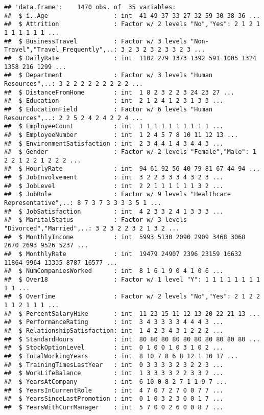 \documentclass[]{article}
\begin{document}
\begin{verbatim}
## 'data.frame':    1470 obs. of  35 variables:
##  $ ï..Age                  : int  41 49 37 33 27 32 59 30 38 36 ...
##  $ Attrition               : Factor w/ 2 levels "No","Yes": 2 1 2 1 1 1 1 1 1 1 ...
##  $ BusinessTravel          : Factor w/ 3 levels "Non-Travel","Travel_Frequently",..: 3 2 3 2 3 2 3 3 2 3 ...
##  $ DailyRate               : int  1102 279 1373 1392 591 1005 1324 1358 216 1299 ...
##  $ Department              : Factor w/ 3 levels "Human Resources",..: 3 2 2 2 2 2 2 2 2 2 ...
##  $ DistanceFromHome        : int  1 8 2 3 2 2 3 24 23 27 ...
##  $ Education               : int  2 1 2 4 1 2 3 1 3 3 ...
##  $ EducationField          : Factor w/ 6 levels "Human Resources",..: 2 2 5 2 4 2 4 2 2 4 ...
##  $ EmployeeCount           : int  1 1 1 1 1 1 1 1 1 1 ...
##  $ EmployeeNumber          : int  1 2 4 5 7 8 10 11 12 13 ...
##  $ EnvironmentSatisfaction : int  2 3 4 4 1 4 3 4 4 3 ...
##  $ Gender                  : Factor w/ 2 levels "Female","Male": 1 2 2 1 2 2 1 2 2 2 ...
##  $ HourlyRate              : int  94 61 92 56 40 79 81 67 44 94 ...
##  $ JobInvolvement          : int  3 2 2 3 3 3 4 3 2 3 ...
##  $ JobLevel                : int  2 2 1 1 1 1 1 1 3 2 ...
##  $ JobRole                 : Factor w/ 9 levels "Healthcare Representative",..: 8 7 3 7 3 3 3 3 5 1 ...
##  $ JobSatisfaction         : int  4 2 3 3 2 4 1 3 3 3 ...
##  $ MaritalStatus           : Factor w/ 3 levels "Divorced","Married",..: 3 2 3 2 2 3 2 1 3 2 ...
##  $ MonthlyIncome           : int  5993 5130 2090 2909 3468 3068 2670 2693 9526 5237 ...
##  $ MonthlyRate             : int  19479 24907 2396 23159 16632 11864 9964 13335 8787 16577 ...
##  $ NumCompaniesWorked      : int  8 1 6 1 9 0 4 1 0 6 ...
##  $ Over18                  : Factor w/ 1 level "Y": 1 1 1 1 1 1 1 1 1 1 ...
##  $ OverTime                : Factor w/ 2 levels "No","Yes": 2 1 2 2 1 1 2 1 1 1 ...
##  $ PercentSalaryHike       : int  11 23 15 11 12 13 20 22 21 13 ...
##  $ PerformanceRating       : int  3 4 3 3 3 3 4 4 4 3 ...
##  $ RelationshipSatisfaction: int  1 4 2 3 4 3 1 2 2 2 ...
##  $ StandardHours           : int  80 80 80 80 80 80 80 80 80 80 ...
##  $ StockOptionLevel        : int  0 1 0 0 1 0 3 1 0 2 ...
##  $ TotalWorkingYears       : int  8 10 7 8 6 8 12 1 10 17 ...
##  $ TrainingTimesLastYear   : int  0 3 3 3 3 2 3 2 2 3 ...
##  $ WorkLifeBalance         : int  1 3 3 3 3 2 2 3 3 2 ...
##  $ YearsAtCompany          : int  6 10 0 8 2 7 1 1 9 7 ...
##  $ YearsInCurrentRole      : int  4 7 0 7 2 7 0 0 7 7 ...
##  $ YearsSinceLastPromotion : int  0 1 0 3 2 3 0 0 1 7 ...
##  $ YearsWithCurrManager    : int  5 7 0 0 2 6 0 0 8 7 ...
\end{verbatim}
\end{document}

